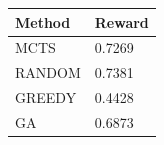\begin{tabular}{ll}
\hline
Method & Reward \\
\hline
  MCTS & 0.7269 \\
  RANDOM & 0.7381 \\
  GREEDY & 0.4428 \\
  GA & 0.6873 \\
\hline
\end{tabular}
